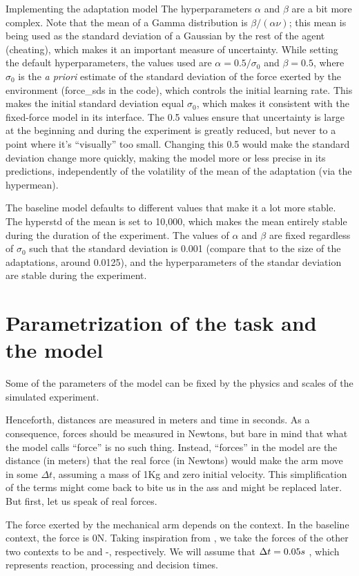 \documentclass{report}
\begin{document}
\begin{chapter}{Implementing the adaptation model}
The hyperparameters $\alpha$ and $\beta$ are a bit more complex. Note that the
mean of a Gamma distribution is $\beta / (\alpha \nu)$; this mean is being used
as the standard deviation of a Gaussian by the rest of the agent (cheating),
which makes it an important measure of uncertainty. While setting the default
hyperparameters, the values used are $\alpha = 0.5 / \sigma_0$ and
$\beta = 0.5$, where $\sigma_0$ is the \textit{a priori} estimate of the
standard deviation of the force exerted by the environment (force\_sds in the
code), which controls the initial learning rate. This makes the initial
standard deviation equal $\sigma_0$, which makes it consistent with the
fixed-force model in its interface. The 0.5 values ensure that uncertainty is
large at the beginning and during the experiment is greatly reduced, but never
to a point where it's ``visually'' too small. Changing this 0.5 would make the
standard deviation change more quickly, making the model more or less precise
in its predictions, independently of the volatility of the mean of the
adaptation (via the hypermean).

The baseline model defaults to different values that make it a lot more
stable. The hyperstd of the mean is set to 10,000, which makes the mean
entirely stable during the duration of the experiment. The values of $\alpha$
and $\beta$ are fixed regardless of $\sigma_0$ such that the standard deviation
is 0.001 (compare that to the size of the adaptations, around 0.0125), and the
hyperparameters of the standar deviation are stable during the experiment.

\section{Parametrization of the task and the model}
Some of the parameters of the model can be fixed by the physics and scales of
the simulated experiment.

Henceforth, distances are measured in meters and time in seconds. As a
consequence, forces should be measured in Newtons, but bare in mind that what
the model calls ``force'' is no such thing. Instead, ``forces'' in the model
are the distance (in meters) that the real force (in Newtons) would make the
arm move in some $\Delta t$, assuming a mass of 1Kg and zero initial
velocity. This simplification of the terms might come back to bite us in the
ass and might be replaced later. But first, let us speak of real forces.

The force exerted by the mechanical arm depends on the context. In the baseline
context, the force is 0N. Taking inspiration from , we
take the forces of the other two contexts to be \force and -\force,
respectively. We will assume that $\Delta t = 0.05s$ , which represents reaction, processing and decision
times.


\end{chapter}
\end{document}
